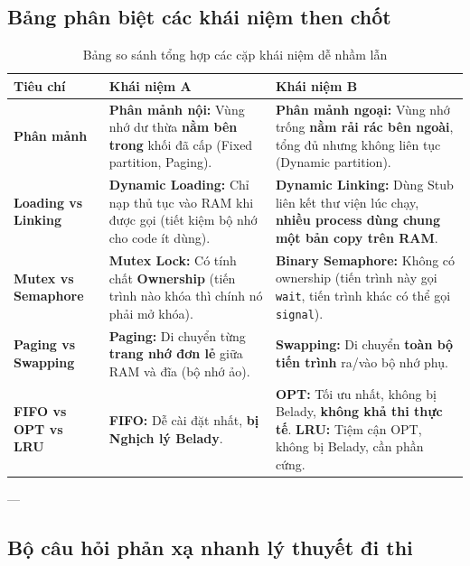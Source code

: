 \documentclass[11pt,a4paper]{article}
\begin{document}
\subsection{Bảng phân biệt các khái niệm then chốt}
\begin{table}[h!]
\centering
\small
\begin{tabularx}{\textwidth}{p{3.5cm} X X}
\toprule
\textbf{Tiêu chí} & \textbf{Khái niệm A} & \textbf{Khái niệm B} \\
\midrule
\textbf{Phân mảnh} & \textbf{Phân mảnh nội:} Vùng nhớ dư thừa \textbf{nằm bên trong} khối đã cấp (Fixed partition, Paging). & \textbf{Phân mảnh ngoại:} Vùng nhớ trống \textbf{nằm rải rác bên ngoài}, tổng đủ nhưng không liên tục (Dynamic partition). \\
\addlinespace
\textbf{Loading vs Linking} & \textbf{Dynamic Loading:} Chỉ nạp thủ tục vào RAM khi được gọi (tiết kiệm bộ nhớ cho code ít dùng). & \textbf{Dynamic Linking:} Dùng Stub liên kết thư viện lúc chạy, \textbf{nhiều process dùng chung một bản copy trên RAM}. \\
\addlinespace
\textbf{Mutex vs Semaphore} & \textbf{Mutex Lock:} Có tính chất \textbf{Ownership} (tiến trình nào khóa thì chính nó phải mở khóa). & \textbf{Binary Semaphore:} Không có ownership (tiến trình này gọi \texttt{wait}, tiến trình khác có thể gọi \texttt{signal}). \\
\addlinespace
\textbf{Paging vs Swapping} & \textbf{Paging:} Di chuyển từng \textbf{trang nhớ đơn lẻ} giữa RAM và đĩa (bộ nhớ ảo). & \textbf{Swapping:} Di chuyển \textbf{toàn bộ tiến trình} ra/vào bộ nhớ phụ. \\
\addlinespace
\textbf{FIFO vs OPT vs LRU} & \textbf{FIFO:} Dễ cài đặt nhất, \textbf{bị Nghịch lý Belady}. & \textbf{OPT:} Tối ưu nhất, không bị Belady, \textbf{không khả thi thực tế}. \textbf{LRU:} Tiệm cận OPT, không bị Belady, cần phần cứng. \\
\bottomrule
\end{tabularx}
\caption{Bảng so sánh tổng hợp các cặp khái niệm dễ nhầm lẫn}
\end{table}

---

\subsection{Bộ câu hỏi phản xạ nhanh lý thuyết đi thi}
\end{document}
